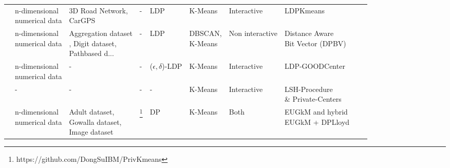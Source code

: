 \begin{landscape}
\begin{table}[ht]
\begin{tabular}{rlllllllll}
      \citep{xia_distributed_2020}               & \makecell[l]{n-dimensional                                                                                                                          \\ numerical data}      & \makecell[l]{3D Road Network, \\ CarGPS}                           & -                                                  & LDP                      & K-Means             & Interactive     & LDPKmeans                        \\
      \citep{sun_distributed_2019}               & \makecell[l]{n-dimensional                                                                                                                          \\ numerical data}     & \makecell[l]{Aggregation dataset \\, Digit dataset, \\ Pathbased d...} & -                                                  & LDP                      & \makecell[l]{DBSCAN,\\  K-Means}     & Non interactive & \makecell[l]{Distance Aware \\ Bit Vector (DPBV)} \\
      \citep{nissim_clustering_2018}             & \makecell[l]{n-dimensional                                                                                                                          \\ numerical data}      & -                                                  & -                                                  & ($\epsilon, \delta$)-LDP & K-Means             & Interactive     & LDP-GOODCenter                   \\
      \citep{nissim_clustering_2018}             & -                          & -                           & -    & -                        & K-Means & Interactive     & \makecell[l]{LSH-Procedure \\ \& Private-Centers} \\
      \citep{su_differentially_2015}             & \makecell[l]{n-dimensional                                                                                                                          \\ numerical data} & \makecell[l]{Adult dataset, \\ Gowalla dataset, \\ Image dataset} & \footnote{https://github.com/DongSuIBM/PrivKmeans} & DP                       & K-Means             & Both            & \makecell[l]{EUGkM and hybrid \\ EUGkM + DPLloyd} \\

\end{tabular}
\end{table}
\end{landscape}
